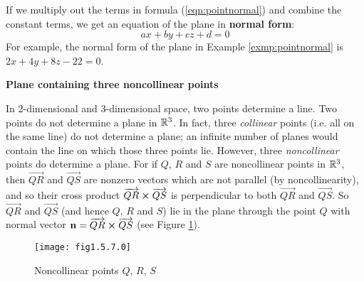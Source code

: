 If we multiply out the terms in formula (\ref{eqn:pointnormal}) and combine the constant terms, we get an
equation of the plane in \textbf{normal form}:
\begin{equation}
 ax + by + cz + d = 0
\end{equation}
For example, the normal form of the plane in Example \ref{exmp:pointnormal} is $2x + 4y + 8z - 22 = 0$.
\newpage
\par\noindent\textbf{\large{Plane containing three noncollinear points}}\normalsize\vspace{1.5mm}

In 2-dimensional and 3-dimensional space, two points determine a line. Two points do not determine a plane in
$\mathbb{R}^{3}$. In fact, three \emph{collinear} points (i.e. all on the same line)
do not determine a plane; an infinite number of planes would contain the line on which those three points lie.
However, three \emph{noncollinear} points do determine a plane. For if $Q$, $R$ and $S$ are noncollinear points in
$\mathbb{R}^{3}$, then $\overrightarrow{QR}$ and $\overrightarrow{QS}$ are  nonzero vectors which are not parallel (by
noncollinearity), and so their cross product $\overrightarrow{QR} \bm{\times} \overrightarrow{QS}$ is perpendicular to
both $\overrightarrow{QR}$ and $\overrightarrow{QS}$. So $\overrightarrow{QR}$ and
$\overrightarrow{QS}$ (and hence $Q$, $R$ and $S$) lie in the plane through the point $Q$ with normal vector
$\textbf{n} = \overrightarrow{QR} \bm{\times} \overrightarrow{QS}$ (see Figure \ref{fig:plane3pts}).

\begin{figure}[h]
 \begin{center}
  \texttt{[image: fig1.5.7.0]}
 \end{center}\vspace{-5mm}
 \caption[]{\quad Noncollinear points $Q$, $R$, $S$}
 \label{fig:plane3pts}
\end{figure}

